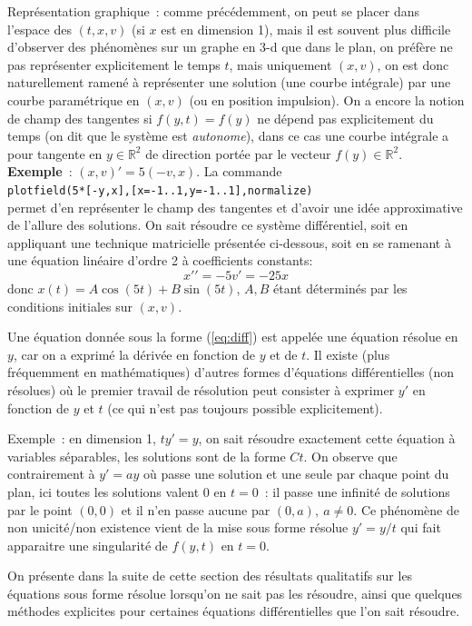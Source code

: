 \documentclass[a4paper,11pt]{article}
\newcommand{\R}{{\mathbb{R}}}
\begin{document}
Repr\'esentation graphique~: comme pr\'ec\'edemment,
on peut se placer dans l'espace
des $(t,x,v)$ (si $x$ est en dimension 1), mais il est souvent
plus difficile d'observer des ph\'enom\`enes sur un graphe
en 3-d que dans le plan, on pr\'ef\`ere ne pas repr\'esenter explicitement le
temps $t$, mais uniquement $(x,v)$, on est donc naturellement
ramen\'e \`a repr\'esenter une solution (une courbe int\'egrale)
par une courbe param\'etrique en $(x,v)$ (ou en position
impulsion). On a encore la notion de champ des tangentes
si $f(y,t)=f(y)$ ne d\'epend pas explicitement du temps
(on dit que le syst\`eme est {\em autonome}), dans ce
cas une courbe int\'egrale a pour tangente en $y\in \R^2$ 
de direction port\'ee par le vecteur $f(y) \in \R^2$.\\
{\bf Exemple}~: $(x,v)'=5(-v,x)$. La commande \\
\verb|plotfield(5*[-y,x],[x=-1..1,y=-1..1],normalize)|\\
permet d'en repr\'esenter le champ des tangentes
et d'avoir une id\'ee approximative de l'allure des solutions.
On sait r\'esoudre ce syst\`eme diff\'erentiel, soit en appliquant
une technique matricielle pr\'esent\'ee ci-dessous, 
soit en se ramenant \`a une \'equation
lin\'eaire d'ordre 2 \`a coefficients constants:
$$ x'{'}=-5v'=-25x$$
donc $x(t)=A\cos(5t)+B\sin(5t)$, $A, B$ \'etant d\'etermin\'es
par les conditions initiales sur $(x,v)$.

Une \'equation donn\'ee sous la forme (\ref{eq:diff}) 
est appel\'ee une \'equation r\'esolue en $y$,
car on a exprim\'e la d\'eriv\'ee en fonction de $y$ et de $t$. Il
existe (plus fr\'equemment en math\'ematiques) d'autres formes d'\'equations
diff\'erentielles (non r\'esolues) o\`u le premier travail de r\'esolution
peut consister \`a exprimer
$y'$ en fonction de $y$ et $t$ (ce qui n'est pas toujours possible 
explicitement).

Exemple~: en dimension 1, $ty'=y$, on sait r\'esoudre exactement
cette \'equation \`a variables s\'eparables, les solutions sont de la 
forme $Ct$. On observe que contrairement \`a $y'=ay$
o\`u passe une solution et une seule par chaque point du plan,
ici toutes les solutions valent 0 en $t=0$~: il passe une
infinit\'e de solutions par le point $(0,0)$ et il n'en passe aucune
par $(0,a), \ a \neq 0$. Ce ph\'enom\`ene de non unicit\'e/non
existence vient de la mise sous forme r\'esolue $y'=y/t$ qui
fait apparaitre une singularit\'e de $f(y,t)$ en $t=0$.

On pr\'esente dans la suite de cette section 
des r\'esultats qualitatifs sur les \'equations sous forme r\'esolue
lorsqu'on ne sait pas les r\'esoudre, ainsi que 
quelques m\'ethodes explicites
pour certaines \'equations diff\'erentielles que l'on sait
r\'esoudre.
\end{document}
